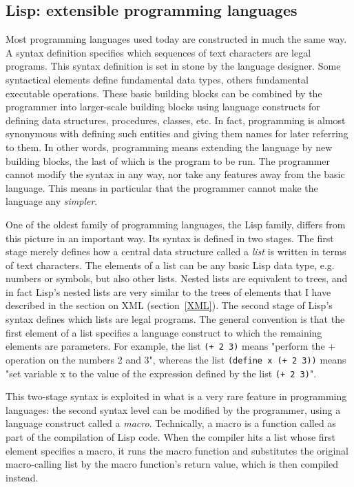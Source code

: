\subsection{Lisp: extensible programming languages}
\label{lisp}

Most programming languages used today are constructed in much the same way. A syntax definition specifies which sequences of text characters are legal programs. This syntax definition is set in stone by the language designer. Some syntactical elements define fundamental data types, others fundamental executable operations. These basic building blocks can be combined by the programmer into larger-scale building blocks using language constructs for defining data structures, procedures, classes, etc. In fact, programming is almost synonymous with defining such entities and giving them names for later referring to them. In other words, programming means extending the language by new building blocks, the last of which is the program to be run. The programmer cannot modify the syntax in any way, nor take any features away from the basic language. This means in particular that the programmer cannot make the language any \textit{simpler}.

One of the oldest family of programming languages, the Lisp family, differs from this picture in an important way. Its syntax is defined in two stages. The first stage merely defines how a central data structure called a \textit{list} is written in terms of text characters. The elements of a list can be any basic Lisp data type, e.g. numbers or symbols, but also other lists. Nested lists are equivalent to trees, and in fact Lisp's nested lists are very similar to the trees of elements that I have described in the section on XML (section~\ref{XML}). The second stage of Lisp's syntax defines which lists are legal programs. The general convention is that the first element of a list specifies a language construct to which the remaining elements are parameters. For example, the list \verb`(+ 2 3)` means "perform the + operation on the numbers 2 and 3", whereas the list \verb`(define x (+ 2 3))` means "set variable x to the value of the expression defined by the list \verb`(+ 2 3)`".

This two-stage syntax is exploited in what is a very rare feature in programming languages: the second syntax level can be modified by the programmer, using a language construct called a \textit{macro}. Technically, a macro is a function called as part of the compilation of Lisp code. When the compiler hits a list whose first element specifies a macro, it runs the macro function and substitutes the original macro-calling list by the macro function's return value, which is then compiled instead.

